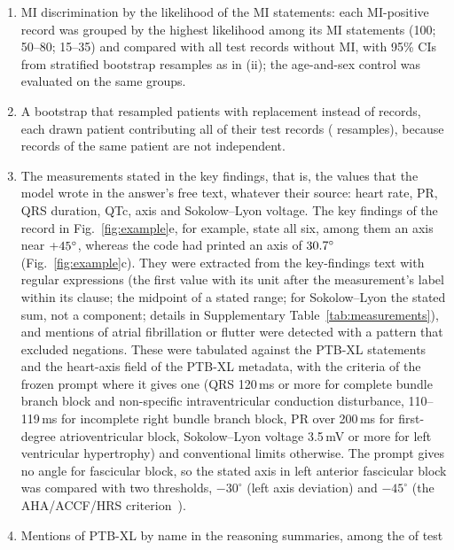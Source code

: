 \begin{enumerate}
  Brier score (the mean squared difference between probability and label) and the calibration slope (the slope of a
  logistic regression of the label on the log-odds of the probability: 1 for calibrated probabilities, above 1 for
  probabilities that are not extreme enough).
  \item MI discrimination by the likelihood of the MI statements: each MI-positive record was grouped by the highest
  likelihood among its MI statements (100; 50--80; 15--35) and compared with all test records without MI, with 95\% CIs
  from \PHNStmtBoot{} stratified bootstrap resamples as in (ii); the age-and-sex control was evaluated on the same
  groups.
  \item A bootstrap that resampled patients with replacement instead of records, each drawn patient contributing all
  of their test records (\NBoot{} resamples), because records of the same patient are not independent.
  \item The measurements stated in the key findings, that is, the values that the model wrote in the answer's free
  text, whatever their source: heart rate, PR, QRS duration, QTc, axis and Sokolow--Lyon voltage. The key findings of
  the record in Fig.~\ref{fig:example}e, for example, state all six, among them an axis near $+45^\circ$,
  whereas the code had printed an axis of $30.7^\circ$ (Fig.~\ref{fig:example}c). They were extracted
  from the key-findings text with regular expressions (the first value with its unit after the
  measurement's label within its clause; the midpoint of a stated range; for Sokolow--Lyon the stated sum, not a
  component; details in Supplementary Table~\ref{tab:measurements}), and mentions of atrial fibrillation or flutter
  were detected with a pattern that excluded negations. These were tabulated against the PTB-XL statements and the
  heart-axis field of the PTB-XL metadata, with the criteria of the frozen prompt where it gives one (QRS 120\,ms or
  more for complete bundle branch block and non-specific intraventricular conduction disturbance, 110--119\,ms for
  incomplete right bundle branch block, PR over 200\,ms for first-degree atrioventricular block, Sokolow--Lyon voltage
  3.5\,mV or more for left ventricular hypertrophy) and conventional limits otherwise. The prompt gives no angle for
  fascicular block, so the stated axis in left anterior fascicular block was compared with two thresholds, $-30^\circ$
  (left axis deviation) and $-45^\circ$ (the AHA/ACCF/HRS criterion~\citep{surawicz2009recommendations}).
  \item Mentions of PTB-XL by name in the reasoning summaries, among the \PHSummariesNonEmptyN{} of \NTest{} test

\end{enumerate}
